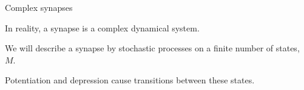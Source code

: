 \documentclass[final,hyperref={pdfpagelabels=false,bookmarks=false}]{beamer}
\begin{document}
\begin{frame}{}
\begin{columns}[t]
\begin{column}{0.26\linewidth}
\begin{block}{Complex synapses}
%
 \begin{minipage}[t]{0.47\linewidth}
   In reality, a synapse is a complex dynamical system.

   \vp We will describe a synapse by stochastic processes on a finite number of states, $M$.

   \vp Potentiation and depression cause transitions between these states.

   \vp
   \begin{center}
   \end{center}
 \end{minipage}
 \begin{minipage}[t]{0.49\linewidth}
   \begin{center}
   \end{center}


\end{minipage}
\end{block}
\end{column}
\end{columns}
\end{frame}
\end{document}

